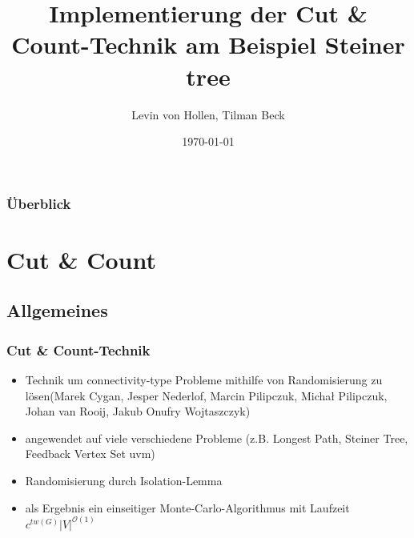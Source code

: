 \documentclass{beamer}
\title[Cut \& Count]{Implementierung der Cut \& Count-Technik am Beispiel Steiner tree} %
\author{
Levin von Hollen, 
Tilman Beck
}
\institute[] %
{
\textit{ \{stu127560-, stu127568-\}@informatik.uni-kiel.de} \\
\medskip
Christian-Albrechts Universität Kiel  %
}
\date{\today} %
\begin{document}
\begin{frame}
\titlepage %
\end{frame}

\begin{frame}
\frametitle{Überblick} %
\tableofcontents %
\end{frame}


\section{Cut \& Count} %
\subsection{Allgemeines}
\begin{frame}
\frametitle{Cut \& Count-Technik}
\begin{itemize}
\item Technik um connectivity-type Probleme mithilfe von Randomisierung zu lösen(Marek Cygan, Jesper Nederlof, Marcin Pilipczuk, Michał Pilipczuk, Johan van Rooij, Jakub Onufry Wojtaszczyk)
\item angewendet auf viele verschiedene Probleme (z.B. Longest Path, Steiner Tree, Feedback Vertex Set uvm)
\item Randomisierung durch Isolation-Lemma 
\item als Ergebnis ein einseitiger Monte-Carlo-Algorithmus mit Laufzeit $c^{tw(G)} |V|^{\mathcal{O}(1)}$
\end{itemize}
\end{frame}
\end{document}
